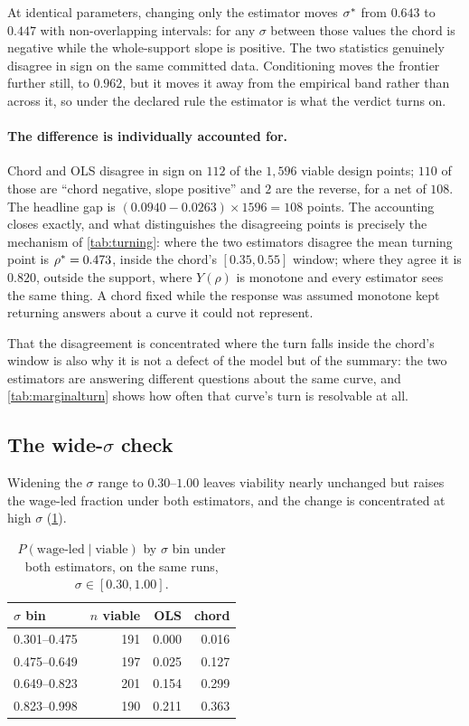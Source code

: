 At identical parameters, changing only the estimator moves $\sigma^{\ast}$ from
$0.643$ to $0.447$ with non-overlapping intervals: for any $\sigma$
between those values the chord is negative while the whole-support slope is
positive. The two statistics genuinely disagree in sign on the same committed
data. Conditioning moves the frontier further still, to $0.962$, but it
moves it away from the empirical band rather than across it, so under
the declared rule the estimator is what the verdict turns on.

\paragraph{The difference is individually accounted for.} Chord and OLS
disagree in sign on $112$ of the $1{,}596$ viable design points; $110$ of those
are ``chord negative, slope positive'' and $2$ are the reverse, for a net of
$108$. The headline gap is $(0.0940 - 0.0263) \times 1596 = 108$ points. The
accounting closes exactly, and what distinguishes the disagreeing points is
precisely the mechanism of \cref{tab:turning}: where the two estimators
disagree the mean turning point is $\rho^{\ast} = 0.473$, inside the
chord's $[0.35, 0.55]$ window; where they agree it is $0.820$, outside the
support, where $Y(\rho)$ is monotone and every estimator sees the same thing.
A chord fixed while the response was assumed monotone kept returning answers
about a curve it could not represent.

That the disagreement is concentrated where the turn falls inside the chord's
window is also why it is not a defect of the model but of the summary: the two
estimators are answering different questions about the same curve, and
\cref{tab:marginalturn} shows how often that curve's turn is resolvable at all.

\subsection{The wide-\texorpdfstring{$\sigma$}{sigma} check}
\label{sec:widesigma}

Widening the $\sigma$ range to $0.30$--$1.00$ leaves viability nearly
unchanged but raises the wage-led fraction under both estimators, and the
change is concentrated at high $\sigma$ (\cref{tab:widesigma}).

\begin{table}[htbp]
\centering
\small
\caption{$P(\text{wage-led} \mid \text{viable})$ by $\sigma$ bin under both
estimators, on the same runs, $\sigma \in [0.30, 1.00]$.}
\label{tab:widesigma}
\begin{tabular}{lrrr}
\toprule
$\sigma$ bin & $n$ viable & OLS & chord\\
\midrule
0.301--0.475 & 191 & 0.000 & 0.016\\
0.475--0.649 & 197 & 0.025 & 0.127\\
0.649--0.823 & 201 & 0.154 & 0.299\\
0.823--0.998 & 190 & 0.211 & 0.363\\
\bottomrule
\end{tabular}
\end{table}

